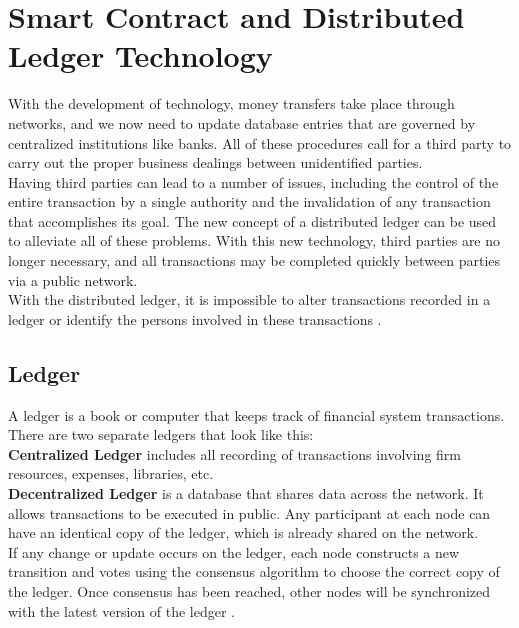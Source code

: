 \chapter{Smart Contract and Distributed Ledger Technology}
With the development of technology, money transfers take place through networks, and we now need to update database entries that are governed by centralized institutions like banks. All of these procedures call for a third party to carry out the proper business dealings between unidentified parties. \\
Having third parties can lead to a number of issues, including the control of the entire transaction by a single authority and the invalidation of any transaction that accomplishes its goal. The new concept of a distributed ledger can be used to alleviate all of these problems. With this new technology, third parties are no longer necessary, and all transactions may be completed quickly between parties via a public network.\\
With the distributed ledger, it is impossible to alter transactions recorded in a ledger or identify the persons involved in these transactions \cite {Masood}. 
\section{Ledger} 
A ledger is a book or computer that keeps track of financial system transactions. There are two separate ledgers that look like this: \\
\textbf{Centralized Ledger} includes all recording of transactions involving firm resources, expenses, libraries, etc.\\
\textbf{Decentralized Ledger} is a database that shares data across the network. It allows transactions to be executed in public. Any participant at each node can have an identical copy of the ledger, which is already shared on the network.\\
If any change or update occurs on the ledger, each node constructs a new transition and votes using the consensus algorithm to choose the correct copy of the ledger. Once consensus has been reached, other nodes will be synchronized with the latest version of the ledger \cite{Ozsu}.

